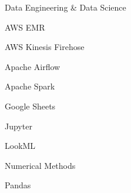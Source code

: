 \begin{skillset}{Data Engineering \& Data Science}
  \item AWS EMR
  \item AWS Kinesis Firehose
  \item Apache Airflow
  \item Apache Spark
  \item Google Sheets
  \item Jupyter
  \item LookML
  \item Numerical Methods
  \item Pandas
\end{skillset}
